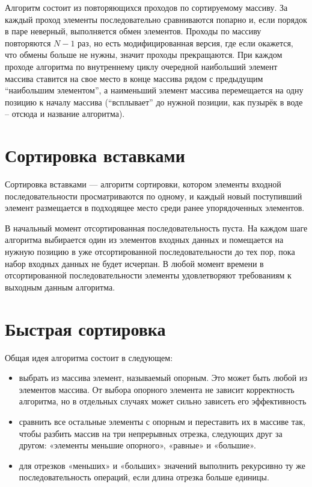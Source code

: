 \documentclass[12pt]{report}
\begin{document}
Алгоритм состоит из повторяющихся проходов по сортируемому массиву.
За каждый проход элементы последовательно сравниваются попарно и, если порядок в паре неверный, выполняется обмен элементов.
Проходы по массиву повторяются $N-1$ раз, но есть модифицированная версия, где если окажется, что обмены больше не нужны, значит проходы прекращаются.
При каждом проходе алгоритма по внутреннему циклу очередной наибольший элемент массива ставится на свое место в конце массива рядом с предыдущим ``наибольшим элементом'', а наименьший элемент массива перемещается на одну позицию к началу массива (``всплывает'' до нужной позиции, как пузырёк в воде -- отсюда и название алгоритма).

\section{Сортировка вставками}

Сортировка вставками — алгоритм сортировки, котором элементы входной последовательности просматриваются по одному, и каждый новый поступивший элемент размещается в подходящее место среди ранее упорядоченных элементов.

В начальный момент отсортированная последовательность пуста.
На каждом шаге алгоритма выбирается один из элементов входных данных и помещается на нужную позицию в уже отсортированной последовательности до тех пор, пока набор входных данных не будет исчерпан.
В любой момент времени в отсортированной последовательности элементы удовлетворяют требованиям к выходным данным алгоритма.

\section{Быстрая сортировка}

Общая идея алгоритма состоит в следующем:

\begin{itemize}
	\item выбрать из массива элемент, называемый опорным. Это может быть любой из элементов массива. От выбора опорного элемента не зависит корректность алгоритма, но в отдельных случаях может сильно зависеть его эффективность 
	\item сравнить все остальные элементы с опорным и переставить их в массиве так, чтобы разбить массив на три непрерывных отрезка, следующих друг за другом: «элементы меньшие опорного», «равные» и «большие».
	\item для отрезков «меньших» и «больших» значений выполнить рекурсивно ту же последовательность операций, если длина отрезка больше единицы.
\end{itemize}
\end{document}
